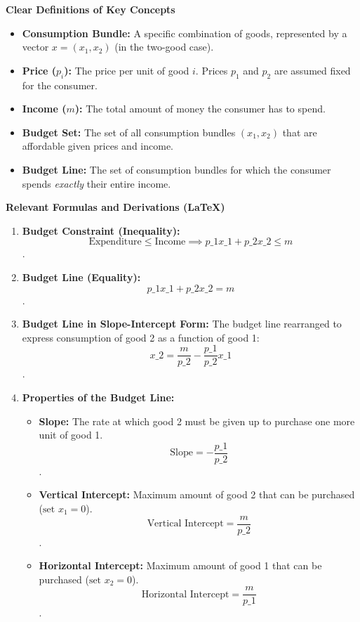 \documentclass{article}
\begin{document}
\textbf{Clear Definitions of Key Concepts}

\begin{itemize}
    \item \textbf{Consumption Bundle:} A specific combination of goods, represented by a vector $x = (x_1, x_2)$ (in the two-good case).
    \item \textbf{Price ($p_i$):} The price per unit of good $i$. Prices $p_1$ and $p_2$ are assumed fixed for the consumer.
    \item \textbf{Income ($m$):} The total amount of money the consumer has to spend.
    \item \textbf{Budget Set:} The set of all consumption bundles $(x_1, x_2)$ that are affordable given prices and income.
    \item \textbf{Budget Line:} The set of consumption bundles for which the consumer spends \textit{exactly} their entire income.
\end{itemize}

\textbf{Relevant Formulas and Derivations (LaTeX)}

\begin{enumerate}
    \item \textbf{Budget Constraint (Inequality):} $$\text{Expenditure} \leq \text{Income} \implies p\_1 x\_1 + p\_2 x\_2 \leq m$$.
    \item \textbf{Budget Line (Equality):} $$p\_1 x\_1 + p\_2 x\_2 = m$$.
    \item \textbf{Budget Line in Slope-Intercept Form:} The budget line rearranged to express consumption of good 2 as a function of good 1: $$x\_2 = \frac{m}{p\_2} - \frac{p\_1}{p\_2} x\_1$$.
    \item \textbf{Properties of the Budget Line:}
    \begin{itemize}
        \item \textbf{Slope:} The rate at which good 2 must be given up to purchase one more unit of good 1. $$\text{Slope} = -\frac{p\_1}{p\_2}$$.
        \item \textbf{Vertical Intercept:} Maximum amount of good 2 that can be purchased ($\text{set } x_1 = 0$). $$\text{Vertical Intercept} = \frac{m}{p\_2}$$.
        \item \textbf{Horizontal Intercept:} Maximum amount of good 1 that can be purchased ($\text{set } x_2 = 0$). $$\text{Horizontal Intercept} = \frac{m}{p\_1}$$.
    \end{itemize}
\end{enumerate}
\end{document}
